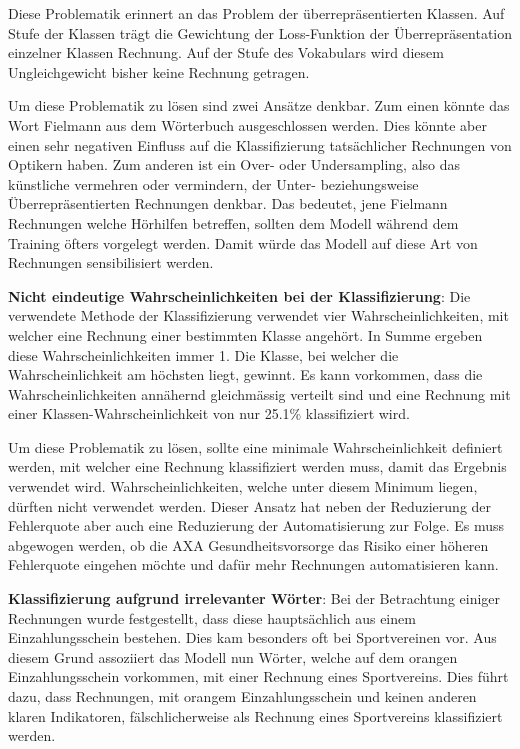 Diese Problematik erinnert an das Problem der überrepräsentierten Klassen. Auf Stufe der Klassen trägt die Gewichtung der Loss-Funktion der Überrepräsentation einzelner Klassen Rechnung. Auf der Stufe des Vokabulars wird diesem Ungleichgewicht bisher keine Rechnung getragen.

Um diese Problematik zu lösen sind zwei Ansätze denkbar. Zum einen könnte das Wort Fielmann aus dem Wörterbuch ausgeschlossen werden. Dies könnte aber einen sehr negativen Einfluss auf die Klassifizierung tatsächlicher Rechnungen von Optikern haben. Zum anderen ist ein Over- oder Undersampling, also das künstliche vermehren oder vermindern, der Unter- beziehungsweise Überrepräsentierten Rechnungen denkbar. Das bedeutet, jene Fielmann Rechnungen welche Hörhilfen betreffen, sollten dem Modell während dem Training öfters vorgelegt werden. Damit würde das Modell auf diese Art von Rechnungen sensibilisiert werden.


\textbf{Nicht eindeutige Wahrscheinlichkeiten bei der Klassifizierung}: Die verwendete Methode der Klassifizierung verwendet vier Wahrscheinlichkeiten, mit welcher eine Rechnung einer bestimmten Klasse angehört. In Summe ergeben diese Wahrscheinlichkeiten immer 1. Die Klasse, bei welcher die Wahrscheinlichkeit am höchsten liegt, gewinnt. Es kann vorkommen, dass die Wahrscheinlichkeiten annähernd gleichmässig verteilt sind und eine Rechnung mit einer Klassen-Wahrscheinlichkeit von nur 25.1\% klassifiziert wird.

Um diese Problematik zu lösen, sollte eine minimale Wahrscheinlichkeit definiert werden, mit welcher eine Rechnung klassifiziert werden muss, damit das Ergebnis verwendet wird. Wahrscheinlichkeiten, welche unter diesem Minimum liegen, dürften nicht verwendet werden. Dieser Ansatz hat neben der Reduzierung der Fehlerquote aber auch eine Reduzierung der Automatisierung zur Folge. Es muss abgewogen werden, ob die AXA Gesundheitsvorsorge das Risiko einer höheren Fehlerquote eingehen möchte und dafür mehr Rechnungen automatisieren kann.


\textbf{Klassifizierung aufgrund irrelevanter Wörter}: Bei der Betrachtung einiger Rechnungen wurde festgestellt, dass diese hauptsächlich aus einem Einzahlungsschein bestehen. Dies kam besonders oft bei Sportvereinen vor. Aus diesem Grund assoziiert das Modell nun Wörter, welche auf dem orangen Einzahlungsschein vorkommen, mit einer Rechnung eines Sportvereins. Dies führt dazu, dass Rechnungen, mit orangem Einzahlungsschein und keinen anderen klaren Indikatoren, fälschlicherweise als Rechnung eines Sportvereins klassifiziert werden.

